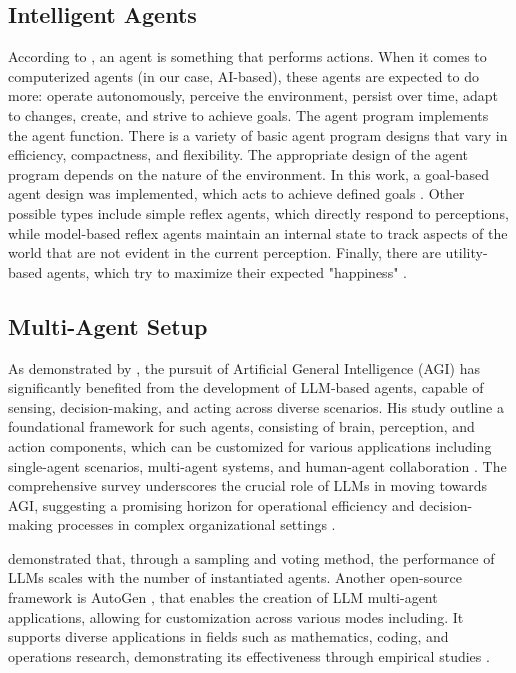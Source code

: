         \subsection{Intelligent Agents} 

            According to \citet{Russell2020}, an agent is something that performs actions. When it comes to computerized agents (in our case, AI-based), these agents are expected to do more: operate autonomously, perceive the environment, persist over time, adapt to changes, create, and strive to achieve goals.
            The agent program implements the agent function.
            There is a variety of basic agent program designs that vary in efficiency, compactness, and flexibility. The appropriate design of the agent program depends on the nature of the environment. In this work, a goal-based agent design was implemented, which acts to achieve defined goals \citep{Russell2020}.
            Other possible types include simple reflex agents, which directly respond to perceptions, while model-based reflex agents maintain an internal state to track aspects of the world that are not evident in the current perception. Finally, there are utility-based agents, which try to maximize their expected "happiness" \citep{Russell2020}.
            
        \subsection{Multi-Agent Setup} 
        
            As demonstrated by \citet{xi2023rise}, the pursuit of Artificial General Intelligence (AGI) has significantly benefited from the development of LLM-based agents, capable of sensing, decision-making, and acting across diverse scenarios.        
            His study outline a foundational framework for such agents, consisting of brain, perception, and action components, which can be customized for various applications including single-agent scenarios, multi-agent systems, and human-agent collaboration . 
            The comprehensive survey underscores the crucial role of LLMs in moving towards AGI, suggesting a promising horizon for operational efficiency and decision-making processes in complex organizational settings \citep{xi2023rise}.

            \citet{Li2024} demonstrated that, through a sampling and voting method, the performance of LLMs scales with the number of instantiated agents.
            Another open-source framework is AutoGen \citep{Wu2023}, that enables the creation of LLM multi-agent applications, allowing for customization across various modes including. It supports diverse applications in fields such as mathematics, coding, and operations research, demonstrating its effectiveness through empirical studies \citep{Wu2023}.

